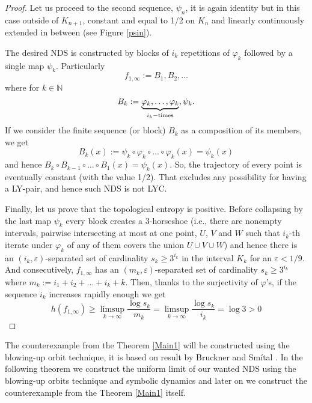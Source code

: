 \documentclass{amsart}
\begin{document}
\begin{proof}
Let us proceed to the second sequence, $\psi_n$, it is again identity but in this case outside of $K_{n+1}$, constant and equal to 1/2 on $K_n$ and linearly continuously extended in between (see Figure \ref{psin}).

The desired NDS is constructed by blocks of $i_k$ repetitions of $\varphi_k$ followed by a single map $\psi_k$. Particularly $$f_{1,\infty} := B_1, B_2, \ldots$$ where for $k\in\mathbb{N}$ $$ B_k := \underbrace{\varphi_k, \ldots, \varphi_k}_{i_k - \mbox{\scriptsize times}}, \psi_k.$$
If we consider the finite sequence (or block) $B_k$ as a composition of its members, we get $$B_k(x) := \psi_k \circ \varphi_k \circ \ldots \circ \varphi_k (x) = \psi_k(x)$$
and hence $B_k \circ B_{k-1} \circ \ldots \circ B_1 (x) = \psi_k(x)$. So, the trajectory of every point is eventually constant (with the value 1/2). That excludes any possibility for having a LY-pair, and hence such NDS is not LYC.

Finally, let us prove that the topological entropy is positive. Before collapsing by the last map $\psi_k$ every block creates a 3-horseshoe (i.e., there are nonempty intervals, pairwise intersecting at most at one point, $U$, $V$ and $W$ such that $i_k$-th iterate under $\varphi_k$ of any of them covers the union $U\cup V \cup W$) and hence there is an $(i_k,\varepsilon)$-separated set of cardinality $s_k \geq 3^{i_k}$ in the interval $K_k$ for an $\varepsilon < 1/9$. And consecutively, $f_{1,\infty}$ has an $(m_k,\varepsilon)$-separated set of cardinality $s_k \geq 3^{i_k}$ where $m_k := i_1 + i_2 + \ldots + i_k + k$. Then, thanks to the surjectivity of $\varphi$'s, if the sequence $i_k$ increases rapidly enough we get $$ h(f_{1,\infty}) \geq \limsup_{k \rightarrow \infty} \frac{\log s_k}{m_k} = \limsup_{k \rightarrow \infty} \frac{\log s_k}{i_k} = \log 3 > 0$$
\end{proof}

The counterexample from the Theorem \ref{Main1} will be constructed using the blowing-up orbit technique, it is based on result by Bruckner and Sm\'{i}tal \cite{BS}. In the following theorem we construct the uniform limit of our wanted NDS using the blowing-up orbits technique and symbolic dynamics and later on we construct the counterexample from the Theorem \ref{Main1} itself.
\end{document}
